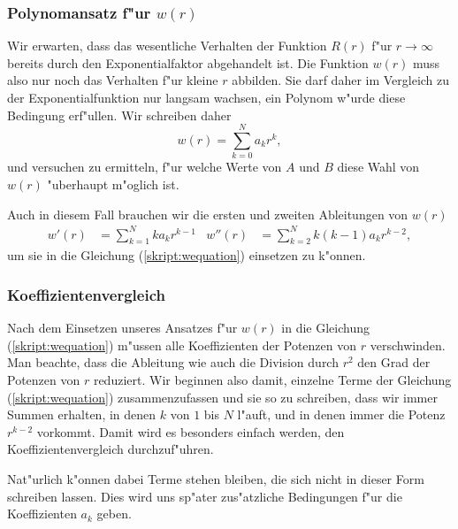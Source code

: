\subsubsection{Polynomansatz f"ur $w(r)$}
Wir erwarten, dass das wesentliche Verhalten der Funktion $R(r)$ 
f"ur $r\to\infty$ bereits durch den Exponentialfaktor abgehandelt ist.
Die Funktion $w(r)$ muss also nur noch das Verhalten f"ur kleine $r$
abbilden.
Sie darf daher im Vergleich zu der Exponentialfunktion nur langsam wachsen,
ein Polynom w"urde diese Bedingung erf"ullen.
Wir schreiben daher
\[
w(r)=\sum_{k=0}^N a_kr^k,
\]
und versuchen zu ermitteln, f"ur welche Werte von $A$ und $B$ diese
Wahl von $w(r)$ "uberhaupt m"oglich ist.

Auch in diesem Fall brauchen wir die ersten und zweiten Ableitungen von
$w(r)$
\begin{align*}
w'(r)&=\sum_{k=1}^Nka_kr^{k-1}
&
w''(r)&=\sum_{k=2}^Nk(k-1)a_kr^{k-2},
\end{align*}
um sie in die Gleichung (\ref{skript:wequation}) einsetzen zu k"onnen.

\subsubsection{Koeffizientenvergleich}
Nach dem Einsetzen unseres Ansatzes f"ur $w(r)$ in die Gleichung
(\ref{skript:wequation})
m"ussen alle Koeffizienten der Potenzen von $r$ verschwinden.
Man beachte, dass die Ableitung wie auch die Division durch $r^2$ den
Grad der Potenzen von $r$ reduziert.
Wir beginnen also damit, einzelne Terme der Gleichung
(\ref{skript:wequation}) zusammenzufassen und sie so zu schreiben,
dass wir immer Summen erhalten, in denen $k$ von $1$ bis $N$ l"auft, 
und in denen immer die Potenz $r^{k-2}$ vorkommt.
Damit wird es besonders einfach werden, den Koeffizientenvergleich
durchzuf"uhren.

Nat"urlich k"onnen dabei Terme stehen bleiben, die
sich nicht in dieser Form schreiben lassen.
Dies wird uns sp"ater zus"atzliche Bedingungen f"ur die Koeffizienten $a_k$
geben.

